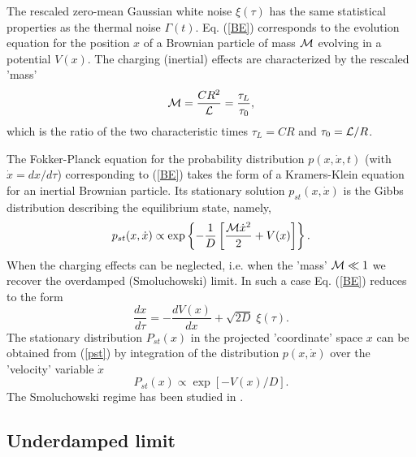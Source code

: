 \documentclass[a4paper,final]{appolb}
\begin{document}
The rescaled  zero-mean Gaussian white noise  $\xi(\tau)$ has the same 
statistical properties as the thermal noise $\Gamma(t)$. 
Eq. (\ref{BE}) corresponds to the evolution equation for the position $x$ 
of a Brownian particle of mass ${\cal M}$ evolving in a potential $V(x)$. 
The charging (inertial) effects are characterized by the rescaled 'mass'  
%
\begin{equation}\label{M}
{\cal{M}} = \frac{CR^2}{{\cal L}} = \frac{\tau_L}{\tau_0} ,
\end{equation}
%
which is the ratio of the two characteristic times $\tau_L =CR$ 
and $\tau_0={\cal L}/R$. 

The Fokker-Planck equation for the probability distribution 
$p(x,\dot x,t)$ (with $\dot x = dx/d\tau$) corresponding to (\ref{BE})
takes the form of a Kramers-Klein equation for an inertial Brownian particle. Its stationary solution 
$p_{st}(x, \dot x)$ is the Gibbs distribution describing the equilibrium state, namely,   
%
\begin{equation}\label{pst}
p_{st}(x, \dot x) \propto \exp\left\{- \frac{1}{D}\left[
\frac{{\cal M}{\dot x}^2}{2} + V(x)\right]\right\}.
\end{equation}
%
When the charging effects can be neglected, i.e. when the 'mass' ${\cal M} \ll 1$
we recover the  overdamped (Smoluchowski) limit.
In such a case Eq. (\ref{BE}) reduces to the form 
%
\begin{equation}\label{OV}
\frac{dx}{d\tau}
=-\frac{dV(x)}{dx}+\sqrt{2D}\;\xi(\tau).  
\end{equation}
%
The stationary distribution $P_{st}(x)$ in the projected 'coordinate' space $x$  can be obtained from (\ref{pst}) by integration 
of the distribution $p(x, \dot x)$ over the  'velocity' variable $\dot x$ 
%
\begin{equation}\label{Pst}
P_{st}(x) \propto \exp\left[- V(x)/D\right].
\end{equation}
%
The Smoluchowski regime has been studied in \cite{daj1}. 

\subsection{Underdamped limit}
\end{document}
